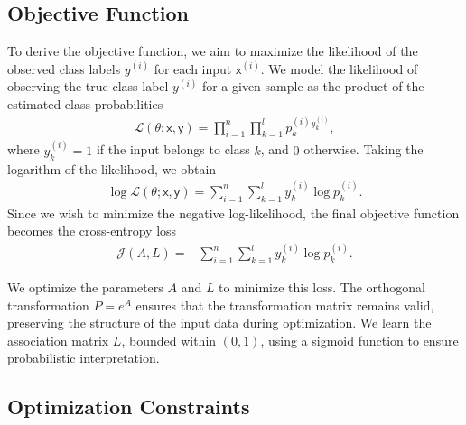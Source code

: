 \documentclass[lettersize,journal]{IEEEtran}
\begin{document}
\subsection{Objective Function}

To derive the objective function, we aim to maximize the likelihood of the observed class labels \( y^{(i)} \) for each input \( \mathsf{x}^{(i)} \). We model the likelihood of observing the true class label \( y^{(i)} \) for a given sample as the product of the estimated class probabilities
\begin{align}
    \mathcal{L}(\theta; \mathsf{x}, \mathsf{y}) = \prod_{i=1}^{n} \prod_{k=1}^{l} p_k^{(i)}{}^{y_k^{(i)}},
\end{align}
where \( y_k^{(i)} = 1 \) if the input belongs to class \( k \), and \( 0 \) otherwise. Taking the logarithm of the likelihood, we obtain
\begin{align}
    \log \mathcal{L}(\theta; \mathsf{x}, \mathsf{y}) = \sum_{i=1}^{n} \sum_{k=1}^{l} y_k^{(i)} \log p_k^{(i)}.
\end{align}
Since we wish to minimize the negative log-likelihood, the final objective function becomes the cross-entropy loss~\cite{bilmes1998gentle}
\begin{align}
    \mathcal{J}(A, L) = -\sum_{i=1}^{n} \sum_{k=1}^{l} y_k^{(i)} \log p_k^{(i)}.
\end{align}

We optimize the parameters \( A \) and \( L \) to minimize this loss. The orthogonal transformation \( P = e^A \) ensures that the transformation matrix remains valid, preserving the structure of the input data during optimization. We learn the association matrix \( L \), bounded within \( (0,1) \), using a sigmoid function to ensure probabilistic interpretation.

\subsection{Optimization Constraints}
\end{document}
